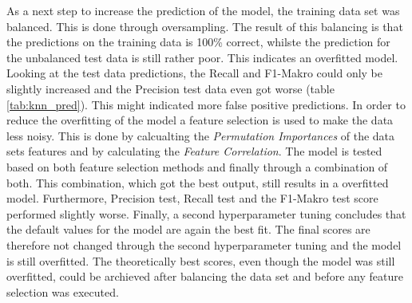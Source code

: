As a next step to increase the prediction of the model, the training data set was balanced. This is done through oversampling. The result of this balancing is that the predictions on the training data is 100\% correct, whilste the prediction for the unbalanced test data is still rather poor. This indicates an overfitted model. Looking at the test data predictions, the Recall and F1-Makro could only be slightly increased and the Precision test data even got worse (table \ref{tab:knn_pred}). This might indicated more false positive predictions. In order to reduce the overfitting of the model a feature selection is used to make the data less noisy. This is done by calcualting the \textit{Permutation Importances} of the data sets features and by calculating the \textit{Feature Correlation}. The model is tested based on both feature selection methods and finally through a combination of both. This combination, which got the best output, still results in a overfitted model. Furthermore, Precision test, Recall test and the F1-Makro test score performed slightly worse. %
Finally, a second hyperparameter tuning concludes that the default values for the model are again the best fit. The final scores are therefore not changed through the second hyperparameter tuning and the model is still overfitted. The theoretically best scores, even though the model was still overfitted, could be archieved after balancing the data set and before any feature selection was executed.



